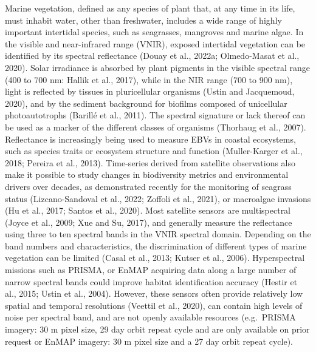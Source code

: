 \documentclass[
  letterpaper,
  11pt,
  english,
  singlespacing,
  headsepline]{MastersDoctoralThesis}
\begin{document}
\begin{spacing}{1.5}
Marine vegetation, defined as any species of plant that, at any time in
its life, must inhabit water, other than freshwater, includes a wide
range of highly important intertidal species, such as seagrasses,
mangroves and marine algae. In the visible and near-infrared range
(VNIR), exposed intertidal vegetation can be identified by its spectral
reflectance (Douay et al., 2022a; Olmedo-Masat et al., 2020). Solar
irradiance is absorbed by plant pigments in the visible spectral range
(400 to 700 nm: Hallik et al., 2017), while in the NIR range (700 to 900
nm), light is reflected by tissues in pluricellular organisms (Ustin and
Jacquemoud, 2020), and by the sediment background for biofilms composed
of unicellular photoautotrophs (Barillé et al., 2011). The spectral
signature or lack thereof can be used as a marker of the different
classes of organisms (Thorhaug et al., 2007). Reflectance is
increasingly being used to measure EBVs in coastal ecosystems, such as
species traits or ecosystem structure and function (Muller-Karger et
al., 2018; Pereira et al., 2013). Time-series derived from satellite
observations also make it possible to study changes in biodiversity
metrics and environmental drivers over decades, as demonstrated recently
for the monitoring of seagrass status (Lizcano-Sandoval et al., 2022;
Zoffoli et al., 2021), or macroalgae invasions (Hu et al., 2017; Santos
et al., 2020). Most satellite sensors are multispectral (Joyce et al.,
2009; Xue and Su, 2017), and generally measure the reflectance using
three to ten spectral bands in the VNIR spectral domain. Depending on
the band numbers and characteristics, the discrimination of different
types of marine vegetation can be limited (Casal et al., 2013; Kutser et
al., 2006). Hyperspectral missions such as PRISMA, or EnMAP acquiring
data along a large number of narrow spectral bands could improve habitat
identification accuracy (Hestir et al., 2015; Ustin et al., 2004).
However, these sensors often provide relatively low spatial and temporal
resolutions (Veettil et al., 2020), can contain high levels of noise per
spectral band, and are not openly available resources (e.g.~PRISMA
imagery: 30 m pixel size, 29 day orbit repeat cycle and are only
available on prior request or EnMAP imagery: 30 m pixel size and a 27
day orbit repeat cycle).


\end{spacing}
\end{document}
